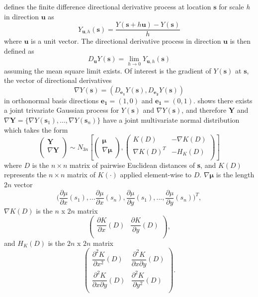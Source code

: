 \documentclass[12pt]{article}
\begin{document}
\cite{banerjee2003directional} defines the finite difference directional derivative process at location $\bm s$ for scale {\it h} in direction $\bm u$ as
\[
Y_{\bm{u},h}(\bm{s}) = \dfrac{ Y(\bm{s} + h\bm{u}) - Y(\bm{s}) }{ h }
\]
where $\bm u$ is a unit vector. The directional derivative process in direction $\bm u$ is then defined as
\[
D_{\bm{u}} Y(\bm{s}) = \displaystyle\lim_{h \rightarrow 0} Y_{\bm{u},h}(\bm{s})
\]
assuming the mean square limit exists. Of interest is the gradient of $Y(\bm s)$ at $\bm{s}$, the vector of directional derivatives
\[
\nabla Y(\bm{s}) = \left( D_{\bm{e_1}} Y(\bm{s}), D_{\bm{e_2}} Y(\bm{s}) \right)
\]
in orthonormal basis directions $\bm{e_1} = (1,0)$ and $\bm{e_1} = (0,1)$. \cite{banerjee2003directional} shows there exists a joint trivariate Gaussian process for $Y(\bm{s})$ and $\nabla Y(\bm{s})$, and therefore $\bm Y$ and $\nabla \bm Y = \{ \nabla Y(\bm s_1),...,\nabla Y(\bm s_n) \}$ have a joint multivariate normal distribution which takes the form
\[
\left( \begin{array}{c}
\textbf{Y} \\
\nabla \textbf{Y} \\
\end{array} \right) \sim
N_{3n} \left[
\left( \begin{array}{c}
\boldsymbol{\mu} \\
\nabla \boldsymbol{\mu} \\
\end{array} \right),
\left( \begin{array}{cc}
K(D) & -\nabla K(D) \\
\nabla K(D)^T & -H_K(D) \\
\end{array} \right)
\right]
\]
where $D$ is the $n \times n$ matrix of pairwise Euclidean distances of \textbf{s}, and $K(D)$ represents the $n \times n$ matrix of $K(\cdot)$ applied element-wise to $D$. $\nabla \boldsymbol{\mu}$ is the length $2n$ vector
\[
\bigg( \dfrac{ \partial{\mu} }{ \partial{x} }(s_1),...\dfrac{ \partial{\mu} }{ \partial{x} }(s_n),\dfrac{ \partial{\mu} }{ \partial{y} }(s_1),...,\dfrac{ \partial{\mu} }{ \partial{y} }(s_n) \bigg)^T,
\]
$\nabla K(D)$ is the $n$ x $2n$ matrix
\[
\left( \begin{array}{cc}
\dfrac{\partial{K}}{\partial{x}}(D) &  \dfrac{\partial{K}}{\partial{y}}(D) \\
\end{array} \right),
\]
and $H_K(D)$ is the $2n$ x $2n$ matrix
\[
\left( \begin{array}{cc}
\dfrac{\partial^2{K}}{\partial{x^2}}(D) &  \dfrac{\partial^2{K}}{\partial{x}\partial{y}}(D) \\
\dfrac{\partial^2{K}}{\partial{x}\partial{y}}(D) & \dfrac{\partial^2{K}}{\partial{y^2}}(D) \\
\end{array} \right).
\]
\end{document}

